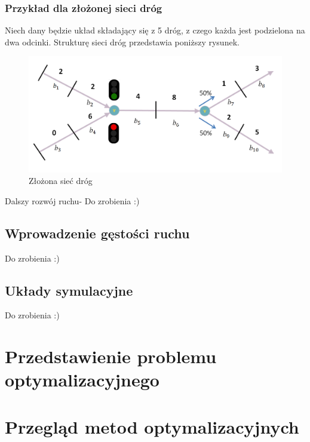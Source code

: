 \documentclass[12pt]{book}
\theoremstyle{plain}
\begin{document}
\subsection{Przykład dla złożonej sieci dróg}
Niech dany będzie układ składający się z 5 dróg, z czego każda jest podzielona na dwa odcinki. Strukturę sieci dróg przedstawia poniższy rysunek.
\begin{figure}[H]
	\centering
	\includegraphics[width=14cm]{5_drog}
	\caption{Złożona sieć dróg}
	\label{fig:5_drog}
\end{figure}
Dalszy rozwój ruchu-
Do zrobienia :)
\section{Wprowadzenie gęstości ruchu}
Do zrobienia :)
\section{Układy symulacyjne}
Do zrobienia :)

\chapter{Przedstawienie problemu optymalizacyjnego}



\chapter{Przegląd metod optymalizacyjnych}
\end{document}
